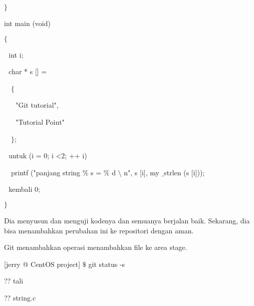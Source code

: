 \noindent 
 \hspace*{0.5in}  $  \}  $ \par
\noindent 
 \hspace*{0.5in} int main (void) \par
\noindent 
 \hspace*{0.5in}  $  \{  $ \par
\noindent 
 \hspace*{0.5in}  $  $ $  $ $  $int i; \par
\noindent 
 \hspace*{0.5in}  $  $ $  $ $  $char * s [] = \par
\noindent 
 \hspace*{0.5in}  $  $ $  $ $  $ $  \{  $ \par
\noindent 
 \hspace*{0.5in}  $  $ $  $ $  $ $  $ $  $ $  $"Git tutorial", \par
\noindent 
 \hspace*{0.5in}  $  $ $  $ $  $ $  $ $  $ $  $"Tutorial Point" \par
\noindent 
 \hspace*{0.5in}  $  $ $  $ $  $ $  \}  $; \par
\noindent 
 \hspace*{0.5in}  $  $ $  $ $  $untuk (i = 0; i <2; ++ i) $  $ $  $ $  $ $  $ $  $ $  $ \par
\noindent 
 $  $ $  $ $  $ \hspace*{0.5in} printf ("panjang string $  \%  $ s = $  \%  $ d  $  \setminus  $ n", s [i], my $  \_  $strlen (s [i])); \par
\noindent 
 \hspace*{0.5in}  $  $ $  $ $  $kembali 0; \par
\noindent 
 \hspace*{0.5in}  $  \}  $ \par
\noindent 
Dia menyusun dan menguji kodenya dan semuanya berjalan baik. Sekarang, dia bisa menambahkan perubahan ini ke repositori dengan aman. \par
\noindent 
Git menambahkan operasi menambahkan file ke area stage. \par
\noindent 
 \hspace*{0.5in} [jerry @ CentOS project]  $  \$  $ git status -s \par
\noindent 
 \hspace*{0.5in} ?? tali \par
\noindent 
 \hspace*{0.5in} ?? string.c \par
